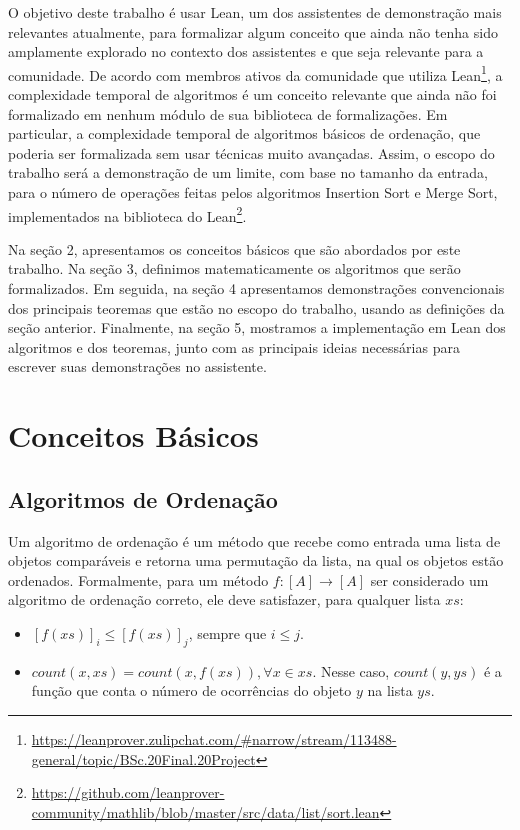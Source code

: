 \documentclass[12pt, oneside, a4paper,english,brazil]{abntex2}
\begin{document}
\qquad O objetivo deste trabalho \'e usar Lean, um dos assistentes de demonstra\c{c}\~ao
mais relevantes atualmente, para formalizar algum conceito que ainda n\~ao tenha sido
amplamente explorado no contexto dos assistentes e que seja relevante para a comunidade.
De acordo com membros ativos da comunidade  que
utiliza
Lean\footnote{\url{https://leanprover.zulipchat.com/\#narrow/stream/113488-general/topic/BSc.20Final.20Project}}, a complexidade temporal de algoritmos é um conceito relevante que
ainda não foi formalizado em nenhum módulo de sua biblioteca de formaliza\c{c}\~oes.
Em particular, a complexidade temporal de algoritmos básicos de ordenação, que poderia ser
formalizada sem usar técnicas muito avançadas. Assim, o escopo do trabalho será
a demonstração de um limite, com base no tamanho da entrada, para o número de
operações feitas pelos algoritmos Insertion Sort e Merge Sort, implementados na
biblioteca do
Lean\footnote{\url{https://github.com/leanprover-community/mathlib/blob/master/src/data/list/sort.lean}}.

\qquad Na se\c{c}\~ao 2, apresentamos os conceitos b\'asicos que s\~ao abordados por este trabalho.
Na se\c{c}\~ao 3, definimos matematicamente
os algoritmos que ser\~ao formalizados. Em seguida, na se\c{c}\~ao 4 apresentamos
demonstra\c{c}\~oes convencionais dos principais teoremas que est\~ao no escopo
do trabalho, usando as defini\c{c}\~oes da se\c{c}\~ao anterior. Finalmente,
na se\c{c}\~ao 5, mostramos a implementa\c{c}\~ao em Lean dos algoritmos e dos teoremas,
junto com as principais ideias necess\'arias para escrever suas demonstra\c{c}\~oes
no assistente.

\chapter{Conceitos B\'asicos}
\section{Algoritmos de Ordena\c{c}\~ao}
\qquad Um algoritmo de ordena\c{c}\~ao \'e um m\'etodo que recebe como entrada uma lista de objetos
compar\'aveis e retorna uma permuta\c{c}\~ao da lista, na qual os objetos est\~ao ordenados. Formalmente,
para um m\'etodo $f : [A] \rightarrow [A]$ ser considerado um algoritmo de ordena\c{c}\~ao correto, ele deve
satisfazer, para qualquer lista $xs$:

\begin{itemize}
  \item $[f(xs)]_{i} \le [f(xs)]_{j}$, sempre que $i \le j$.
  \item $count(x, xs) = count(x, f(xs)) ,  \forall x \in xs$. Nesse caso, $count(y, ys)$ \'e a fun\c{c}\~ao
        que conta o n\'umero de ocorr\^encias do objeto $y$ na lista $ys$.
\end{itemize}
\end{document}
